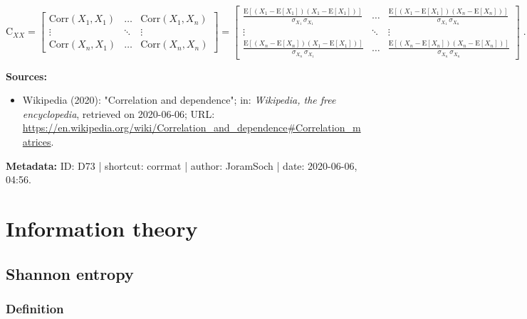 \documentclass[a4paper,12pt,twoside]{book}
\begin{document}
\begin{equation} \label{eq:corrmat-corrmat}
\mathrm{C}_{XX} =
\begin{bmatrix}
\mathrm{Corr}(X_1,X_1) & \ldots & \mathrm{Corr}(X_1,X_n) \\
\vdots & \ddots & \vdots \\
\mathrm{Corr}(X_n,X_1) & \ldots & \mathrm{Corr}(X_n,X_n)
\end{bmatrix} =
\begin{bmatrix}
\frac{\mathrm{E}\left[(X_1-\mathrm{E}[X_1]) (X_1-\mathrm{E}[X_1])\right]}{\sigma_{X_1} \, \sigma_{X_1}} & \ldots & \frac{\mathrm{E}\left[(X_1-\mathrm{E}[X_1]) (X_n-\mathrm{E}[X_n])\right]}{\sigma_{X_1} \, \sigma_{X_n}} \\
\vdots & \ddots & \vdots \\
\frac{\mathrm{E}\left[(X_n-\mathrm{E}[X_n]) (X_1-\mathrm{E}[X_1])\right]}{\sigma_{X_n} \, \sigma_{X_1}} & \ldots & \frac{\mathrm{E}\left[(X_n-\mathrm{E}[X_n]) (X_n-\mathrm{E}[X_n])\right]}{\sigma_{X_n} \, \sigma_{X_n}}
\end{bmatrix} \; .
\end{equation}


\vspace{1em}
\textbf{Sources:}
\begin{itemize}
\item Wikipedia (2020): "Correlation and dependence"; in: \textit{Wikipedia, the free encyclopedia}, retrieved on 2020-06-06; URL: \url{https://en.wikipedia.org/wiki/Correlation_and_dependence#Correlation_matrices}.
\end{itemize}


\vspace{1em}
\textbf{Metadata:} ID: D73 | shortcut: corrmat | author: JoramSoch | date: 2020-06-06, 04:56.
\vspace{1em}



\pagebreak
\section{Information theory}

\subsection{Shannon entropy}

\subsubsection[\textit{Definition}]{Definition} \label{sec:ent}
\setcounter{equation}{0}
\end{document}
